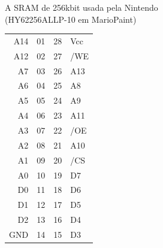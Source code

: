 \documentclass[paper=a4, fontsize=11pt]{scrartcl}	%
\numberwithin{equation}{section}															%
\numberwithin{figure}{section}																%
\numberwithin{table}{section}																%
\begin{document}
A SRAM de 256kbit usada pela Nintendo\\
(HY62256ALLP-10 em MarioPaint)\\
\begin{tabular}{rlrl}
               A14  & 01   &      28 &  Vcc\\
               A12  & 02   &      27 &  /WE\\
                A7  & 03   &      26 &  A13\\
                A6  & 04   &      25 &  A8\\
                A5  & 05   &      24 &  A9\\
                A4  & 06   &      23 &  A11\\
                A3  & 07   &      22 &  /OE\\
                A2  & 08   &      21 &  A10\\
                A1  & 09   &      20 &  /CS\\
                A0  & 10   &      19 &  D7\\
                D0  & 11   &      18 &  D6\\
                D1  & 12   &      17 &  D5\\
                D2  & 13   &      16 &  D4\\
               GND  & 14   &      15 &  D3\\
\end{tabular}
\end{document}
